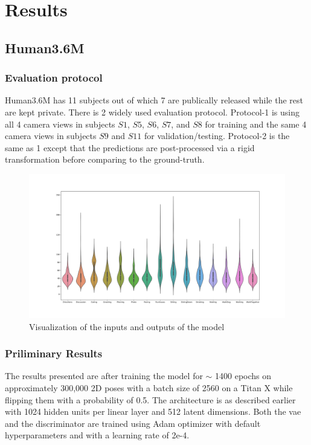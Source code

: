 \chapter{Results} %
\label{chap:results}
\section{Human3.6M}
\subsection{Evaluation protocol}
Human3.6M has 11 subjects out of which 7 are publically released while the rest are kept private. There is 2 widely used evaluation protocol. Protocol-1 is using all 4 camera views in subjects $S1$, $S5$, $S6$, $S7$, and $S8$ for training and the same 4 camera views in subjects $S9$ and $S11$ for validation/testing. Protocol-2 is the same as 1 except that the predictions are post-processed via a rigid transformation
before comparing to the ground-truth.


\begin{figure}[h]
    \centering
    \includegraphics[scale=0.4]{figures/results/violin_pjpe.svg}
    \caption{Visualization of the inputs and outputs of the model}
    \label{fig:violin}
\end{figure}


\subsection{Priliminary Results}

The results presented are after training the model for $\sim$ 1400 epochs on approximately 300,000 2D poses with a batch size of 2560 on a Titan X while flipping them with a probability of 0.5. The architecture is as described earlier with 1024 hidden units per linear layer and 512 latent dimensions. Both the \ac{vae} and the discriminator are trained using Adam optimizer with default hyperparameters and with a learning rate of 2e-4. 

